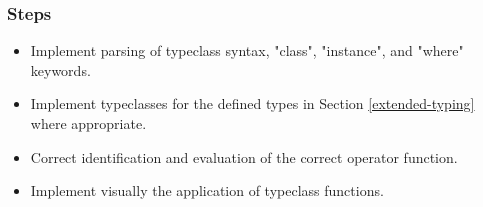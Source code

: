 \documentclass[a4paper]{article}
\begin{document}
\subsubsection{Steps}
\begin{itemize}
    \item Implement parsing of typeclass syntax, "class", "instance", and "where" keywords.
    \item Implement typeclasses for the defined types in Section \ref{extended-typing} where appropriate.
    \item Correct identification and evaluation of the correct operator function.
    \item Implement visually the application of typeclass functions.
\end{itemize}
\printbibliography
\end{document}

